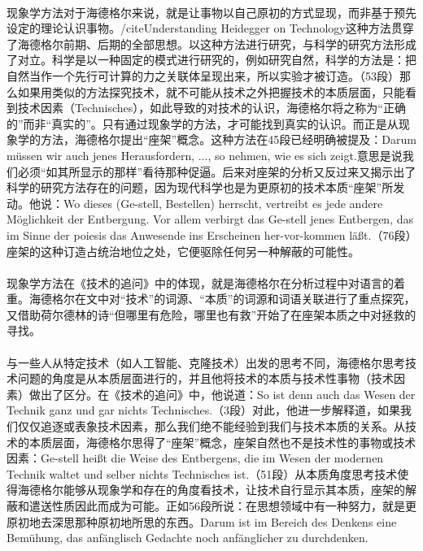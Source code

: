 \documentclass{article}
\begin{document}
		\paragraph{}
		现象学方法对于海德格尔来说，就是让事物以自己原初的方式显现，而非基于预先设定的理论认识事物。/cite{Understanding Heidegger on Technology}这种方法贯穿了海德格尔前期、后期的全部思想。以这种方法进行研究，与科学的研究方法形成了对立。科学是以一种固定的模式进行研究的，例如研究自然，科学的方法是：把自然当作一个先行可计算的力之关联体呈现出来，所以实验才被订造。（53段）那么如果用类似的方法探究技术，就不可能从技术之外把握技术的本质层面，只能看到技术因素（Technisches），如此导致的对技术的认识，海德格尔将之称为“正确的”而非“真实的”。只有通过现象学的方法，才可能找到真实的认识。而正是从现象学的方法，海德格尔提出“座架”概念。这种方法在45段已经明确被提及：Darum müssen wir auch jenes Herausfordern, ..., so nehmen, wie es sich zeigt.意思是说我们必须“如其所显示的那样”看待那种促逼。后来对座架的分析又反过来又揭示出了科学的研究方法存在的问题，因为现代科学也是为更原初的技术本质“座架”所发动。他说：Wo dieses (Ge-stell, Bestellen) herrscht, vertreibt es jede andere Möglichkeit der Entbergung. Vor allem verbirgt das Ge-stell jenes Entbergen, das im Sinne der poiesis das Anwesende ins Erscheinen her-vor-kommen läßt.（76段）座架的这种订造占统治地位之处，它便驱除任何另一种解蔽的可能性。
		\paragraph{}
		现象学方法在《技术的追问》中的体现，就是海德格尔在分析过程中对语言的着重。海德格尔在文中对“技术”的词源、“本质”的词源和词语关联进行了重点探究，又借助荷尔德林的诗“但哪里有危险，哪里也有救”开始了在座架本质之中对拯救的寻找。
		\paragraph{}
与一些人从特定技术（如人工智能、克隆技术）出发的思考不同，海德格尔思考技术问题的角度是从本质层面进行的，并且他将技术的本质与技术性事物（技术因素）做出了区分。在《技术的追问》中，他说道：So ist denn auch das Wesen der Technik ganz und gar nichts Technisches.（3段）对此，他进一步解释道，如果我们仅仅追逐或表象技术因素，那么我们绝不能经验到我们与技术本质的关系。从技术的本质层面，海德格尔思得了“座架”概念，座架自然也不是技术性的事物或技术因素：Ge-stell heißt die Weise des Entbergens, die im Wesen der modernen Technik waltet und selber nichts Technisches ist.（51段）从本质角度思考技术使得海德格尔能够从现象学和存在的角度看技术，让技术自行显示其本质，座架的解蔽和遣送性质因此而成为可能。正如56段所说：在思想领域中有一种努力，就是更原初地去深思那种原初地所思的东西。Darum ist im Bereich des Denkens eine Bemühung, das anfänglisch Gedachte noch anfänglicher zu durchdenken.
\end{document}
